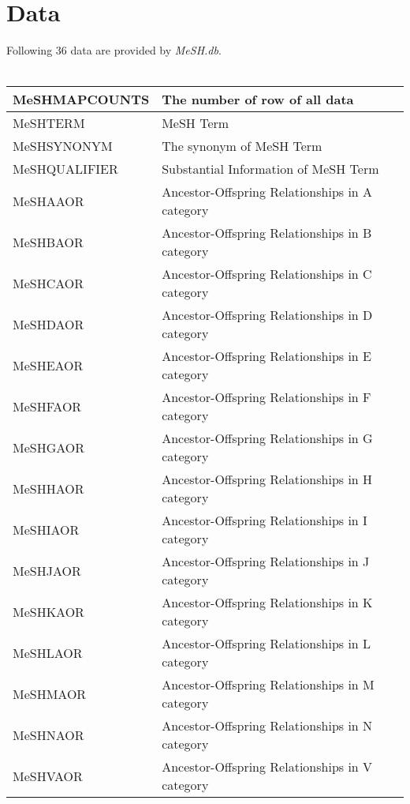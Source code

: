 \documentclass[11pt]{article}
\newcommand{\Rpackage}[1]{{\textit{#1}}}
\begin{document}
\section{Data}
Following 36 data are provided by \Rpackage{MeSH.db}.
\\\\
\begin{center}
  \begin{table}[htbp]
    \begin{tabular*}{150mm}{@{\extracolsep{\fill}}|p{40mm}|p{100mm}|}\hline
      MeSHMAPCOUNTS & The number of row of all data \\ \hline
      MeSHTERM & MeSH Term\\ \hline
      MeSHSYNONYM & The synonym of MeSH Term \\ \hline
      MeSHQUALIFIER & Substantial Information of MeSH Term \\ \hline \hline
      MeSHAAOR & Ancestor-Offspring Relationships in A category \\ \hline
      MeSHBAOR & Ancestor-Offspring Relationships in B category \\ \hline
      MeSHCAOR & Ancestor-Offspring Relationships in C category \\ \hline
      MeSHDAOR & Ancestor-Offspring Relationships in D category \\ \hline
      MeSHEAOR & Ancestor-Offspring Relationships in E category \\ \hline
      MeSHFAOR & Ancestor-Offspring Relationships in F category \\ \hline
      MeSHGAOR & Ancestor-Offspring Relationships in G category \\ \hline
      MeSHHAOR & Ancestor-Offspring Relationships in H category \\ \hline
      MeSHIAOR & Ancestor-Offspring Relationships in I category \\ \hline
      MeSHJAOR & Ancestor-Offspring Relationships in J category \\ \hline
      MeSHKAOR & Ancestor-Offspring Relationships in K category \\ \hline
      MeSHLAOR & Ancestor-Offspring Relationships in L category \\ \hline
      MeSHMAOR & Ancestor-Offspring Relationships in M category \\ \hline
      MeSHNAOR & Ancestor-Offspring Relationships in N category \\ \hline
      MeSHVAOR & Ancestor-Offspring Relationships in V category \\ \hline

\end{tabular*}
\end{table}
\end{center}
\end{document}
